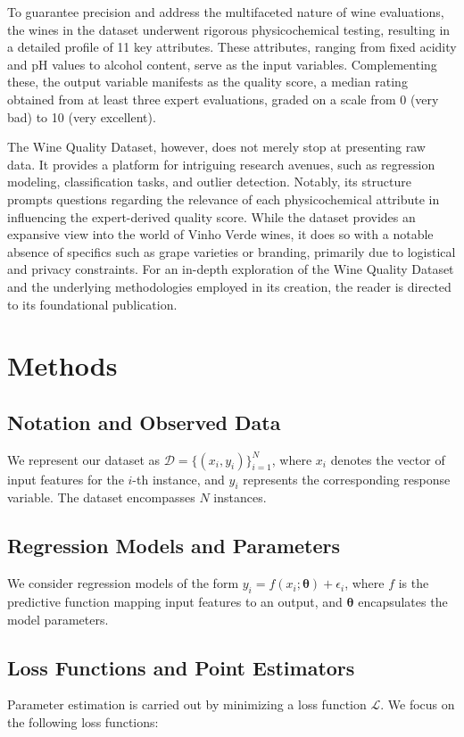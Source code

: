 \documentclass[12pt]{article}
\begin{document}
To guarantee precision and address the multifaceted nature of wine evaluations, the wines in the dataset underwent rigorous physicochemical testing, resulting in a detailed profile of 11 key attributes. These attributes, ranging from fixed acidity and pH values to alcohol content, serve as the input variables. Complementing these, the output variable manifests as the quality score, a median rating obtained from at least three expert evaluations, graded on a scale from 0 (very bad) to 10 (very excellent).

The Wine Quality Dataset, however, does not merely stop at presenting raw data. It provides a platform for intriguing research avenues, such as regression modeling, classification tasks, and outlier detection. Notably, its structure prompts questions regarding the relevance of each physicochemical attribute in influencing the expert-derived quality score. While the dataset provides an expansive view into the world of Vinho Verde wines, it does so with a notable absence of specifics such as grape varieties or branding, primarily due to logistical and privacy constraints. For an in-depth exploration of the Wine Quality Dataset and the underlying methodologies employed in its creation, the reader is directed to its foundational publication\citep{cortez_wine_quality}.

\section{Methods}

\subsection{Notation and Observed Data}
We represent our dataset as \( \mathcal{D} = \{ (x_i, y_i) \}_{i=1}^{N} \), where \( x_i \) denotes the vector of input features for the \( i \)-th instance, and \( y_i \) represents the corresponding response variable. The dataset encompasses \( N \) instances.

\subsection{Regression Models and Parameters}
We consider regression models of the form \( y_i = f(x_i; \boldsymbol{\theta}) + \epsilon_i \), where \( f \) is the predictive function mapping input features to an output, and \( \boldsymbol{\theta} \) encapsulates the model parameters.

\subsection{Loss Functions and Point Estimators}
Parameter estimation is carried out by minimizing a loss function \( \mathcal{L} \). We focus on the following loss functions:
\end{document}
